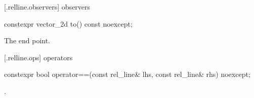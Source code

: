  [\iotwod.relline.observers]{ observers}

%
\begin{itemdecl}
constexpr vector_2d to() const noexcept;
\end{itemdecl}
\begin{itemdescr}
\pnum
\returns
The end point.
\end{itemdescr}

 [\iotwod.relline.ops]{ operators}

%
\begin{itemdecl}
constexpr bool operator==(const rel_line& lhs, const rel_line& rhs) noexcept;
\end{itemdecl}
\begin{itemdescr}
\pnum
\returns
{}.
\end{itemdescr}
